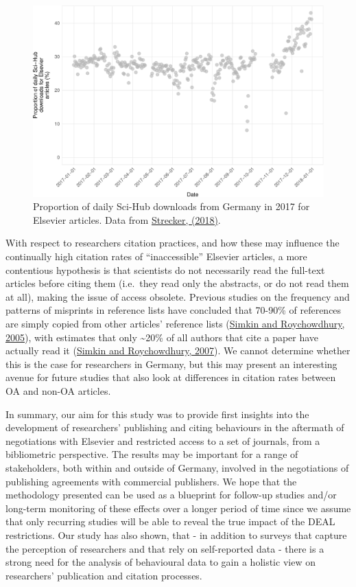 \documentclass[
]{article}
\begin{document}
\begin{figure}

{\centering \includegraphics[width=0.75\linewidth]{analysis_files/figure-latex/scihub-germany-1} 

}

\caption{Proportion of daily Sci-Hub downloads from Germany in 2017 for Elsevier articles. Data from \href{http://doi.org/10.5281/zenodo.1286284}{Strecker, (2018)}.}\label{fig:scihub-germany}
\end{figure}

With respect to researchers citation practices, and how these may influence the continually high citation rates of ``inaccessible'' Elsevier articles, a more contentious hypothesis is that scientists do not necessarily read the full-text articles before citing them (i.e.~they read only the abstracts, or do not read them at all), making the issue of access obsolete. Previous studies on the frequency and patterns of misprints in reference lists have concluded that 70-90\% of references are simply copied from other articles' reference lists (\href{https://doi.org/10.1007/s11192-005-0028-2}{Simkin and Roychowdhury, 2005}), with estimates that only \textasciitilde20\% of all authors that cite a paper have actually read it (\href{https://doi.org/10.1002/asi.20653}{Simkin and Roychowdhury, 2007}). We cannot determine whether this is the case for researchers in Germany, but this may present an interesting avenue for future studies that also look at differences in citation rates between OA and non-OA articles.

In summary, our aim for this study was to provide first insights into the development of researchers' publishing and citing behaviours in the aftermath of negotiations with Elsevier and restricted access to a set of journals, from a bibliometric perspective. The results may be important for a range of stakeholders, both within and outside of Germany, involved in the negotiations of publishing agreements with commercial publishers. We hope that the methodology presented can be used as a blueprint for follow-up studies and/or long-term monitoring of these effects over a longer period of time since we assume that only recurring studies will be able to reveal the true impact of the DEAL restrictions. Our study has also shown, that - in addition to surveys that capture the perception of researchers and that rely on self-reported data - there is a strong need for the analysis of behavioural data to gain a holistic view on researchers' publication and citation processes.
\end{document}
